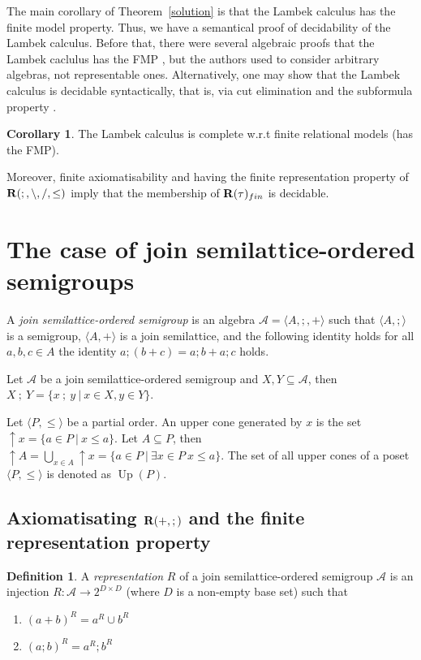 \documentclass[a4paper]{article}
\theoremstyle{definition}
\newtheorem{definition}{Definition}
\theoremstyle{theorem}
\theoremstyle{proposition}
\theoremstyle{lemma}
\theoremstyle{ex}
\theoremstyle{corollary}
\newtheorem{corollary}{Corollary}
\theoremstyle{claim}
\begin{document}
The main corollary of Theorem~\ref{solution} is that the Lambek calculus has the finite model property. Thus, we have a semantical proof of decidability of the Lambek calculus. Before that, there were several algebraic proofs that the Lambek caclulus has the FMP \cite{buszkowski2008infinitary}, but the authors used to consider arbitrary algebras, not representable ones.
Alternatively, one may show that the Lambek calculus is decidable syntactically, that is, via cut elimination and the subformula property \cite{lambek1958mathematics}.

\begin{corollary} \label{fmp}
  The Lambek calculus is complete w.r.t finite relational models (has the FMP).
\end{corollary}

Moreover, finite axiomatisability and having the finite representation property of ${\bf R}(;, \setminus, /, \leq)$ imply that the membership of ${\bf R}(\tau)_{fin}$ is decidable.

\section{The case of join semilattice-ordered semigroups}

A \emph{join semilattice-ordered semigroup} is an algebra $\mathcal{A} = \langle A, ;, + \rangle$ such that $\langle A, ; \rangle$ is a semigroup, $\langle A, + \rangle$ is a join semilattice, and the following identity holds for all $a, b, c \in A$ the identity $a ; (b + c) = a ; b + a ; c$ holds.

Let $\mathcal{A}$ be a join semilattice-ordered semigroup and $X, Y \subseteq \mathcal{A}$, then $X \: ; \: Y = \{ x \: ; \: y \: | \: x \in X, y \in Y \}$.

Let $\langle P, \leq \rangle$ be a partial order. An upper cone generated by $x$ is the set $\uparrow x = \{ a \in P \: | \: x \leq a \}$. Let $A \subseteq P$, then $\uparrow A = \bigcup \limits_{x \in A} \uparrow x = \{ a \in P \: | \: \exists x \in P \: x \leq a \}$. The set of all upper cones of a poset $\langle P, \leq \rangle$ is denoted as $\operatorname{Up}(P)$.

\subsection{Axiomatisating ${\bf R}(+, ;)$ and the finite representation property}

\begin{definition}
  A \emph{representation} $R$ of a join semilattice-ordered semigroup $\mathcal{A}$
  is an injection $R : \mathcal{A} \to 2^{D \times D}$ (where $D$ is a non-empty base set) such that
  \begin{enumerate}
    \item $(a + b)^R = a^R \cup b^R$
    \item $(a ; b)^R = a^R ; b^R$
  \end{enumerate}
\end{definition}
\end{document}
